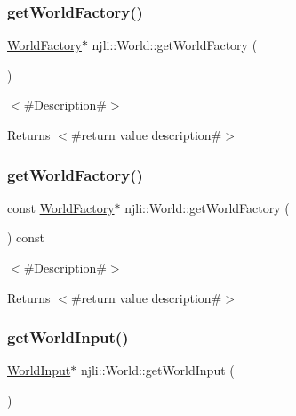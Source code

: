\subsubsection{\texorpdfstring{get\+World\+Factory()}{getWorldFactory()}\hspace{0.1cm}{\footnotesize\ttfamily [1/2]}}
{\footnotesize\ttfamily \mbox{\hyperlink{classnjli_1_1_world_factory}{World\+Factory}}$\ast$ njli\+::\+World\+::get\+World\+Factory (\begin{DoxyParamCaption}{ }\end{DoxyParamCaption})}

$<$\#\+Description\#$>$

\begin{DoxyReturn}{Returns}
$<$\#return value description\#$>$ 
\end{DoxyReturn}
\mbox{\label{classnjli_1_1_world_abfd08290519a0525e79f8961cff41c33}} 
\subsubsection{\texorpdfstring{get\+World\+Factory()}{getWorldFactory()}\hspace{0.1cm}{\footnotesize\ttfamily [2/2]}}
{\footnotesize\ttfamily const \mbox{\hyperlink{classnjli_1_1_world_factory}{World\+Factory}}$\ast$ njli\+::\+World\+::get\+World\+Factory (\begin{DoxyParamCaption}{ }\end{DoxyParamCaption}) const}

$<$\#\+Description\#$>$

\begin{DoxyReturn}{Returns}
$<$\#return value description\#$>$ 
\end{DoxyReturn}
\mbox{\label{classnjli_1_1_world_a9b8a2755f4643d169d54e047554ba8f2}} 
\subsubsection{\texorpdfstring{get\+World\+Input()}{getWorldInput()}\hspace{0.1cm}{\footnotesize\ttfamily [1/2]}}
{\footnotesize\ttfamily \mbox{\hyperlink{classnjli_1_1_world_input}{World\+Input}}$\ast$ njli\+::\+World\+::get\+World\+Input (\begin{DoxyParamCaption}{ }\end{DoxyParamCaption})}

